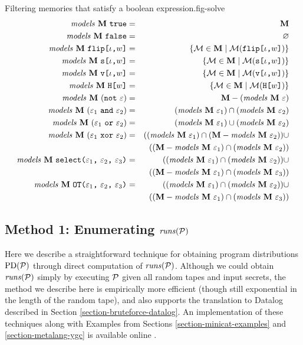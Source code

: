 \begin{fpfig}[t]{Filtering memories that satisfy a boolean expression.}{fig-solve}
\begin{eqnarray*}
\mathit{models}\ \mathbf{M}\ \texttt{true} &=& \mathbf{M}\\
\mathit{models}\ \mathbf{M}\ \texttt{false} &=& \varnothing\\
\mathit{models}\ \mathbf{M}\ \texttt{flip[}\iota\texttt{,}w\texttt{]} &=& \{ \mathcal{M} \in \mathbf{M} \mid \mathcal{M}(\texttt{flip[}\iota\texttt{,}w\texttt{]}) \} \\
\mathit{models}\ \mathbf{M}\ \texttt{s[}\iota\texttt{,}w\texttt{]} &=& \{ \mathcal{M} \in \mathbf{M} \mid \mathcal{M}(\texttt{s[}\iota\texttt{,}w\texttt{]}) \} \\
\mathit{models}\ \mathbf{M}\ \texttt{v[}\iota\texttt{,}w\texttt{]} &=& \{ \mathcal{M} \in \mathbf{M} \mid \mathcal{M}(\texttt{v[}\iota\texttt{,}w\texttt{]}) \} \\
\mathit{models}\ \mathbf{M}\ \texttt{H[}w\texttt{]} &=& \{ \mathcal{M} \in \mathbf{M} \mid \mathcal{M}(\texttt{H[}w\texttt{]}) \} \\
\mathit{models}\ \mathbf{M}\ (\texttt{not}\ \varepsilon) &=& \mathbf{M} - (\mathit{models}\ \mathbf{M}\ \varepsilon)\\
\mathit{models}\ \mathbf{M}\ (\varepsilon_1\ \texttt{and}\ \varepsilon_2) &=& (\mathit{models}\ \mathbf{M}\ \varepsilon_1) \cap (\mathit{models}\ \mathbf{M}\ \varepsilon_2) \\
\mathit{models}\ \mathbf{M}\ (\varepsilon_1\ \texttt{or}\ \varepsilon_2) &=& (\mathit{models}\ \mathbf{M}\ \varepsilon_1) \cup (\mathit{models}\ \mathbf{M}\ \varepsilon_2) \\
\mathit{models}\ \mathbf{M}\ (\varepsilon_1\ \texttt{xor}\ \varepsilon_2) &=&
 ((\mathit{models}\ \mathbf{M}\ \varepsilon_1) \cap (\mathbf{M} - \mathit{models}\ \mathbf{M}\ \varepsilon_2)) \cup\\
 && ((\mathbf{M} - \mathit{models}\ \mathbf{M}\ \varepsilon_1) \cap (\mathit{models}\ \mathbf{M}\ \varepsilon_2)) \\
\mathit{models}\ \mathbf{M}\ \texttt{select(} \varepsilon_1 \texttt{,}\ \varepsilon_2 \texttt{,}\ \varepsilon_3 \texttt{)} &=&
 ((\mathit{models}\ \mathbf{M}\ \varepsilon_1) \cap (\mathit{models}\ \mathbf{M}\ \varepsilon_2)) \cup \\
 && ((\mathbf{M} - \mathit{models}\ \mathbf{M}\ \varepsilon_1) \cap (\mathit{models}\ \mathbf{M}\ \varepsilon_3)) \\
\mathit{models}\ \mathbf{M}\ \texttt{OT(} \varepsilon_1 \texttt{,}\ \varepsilon_2 \texttt{,}\ \varepsilon_3 \texttt{)} &=&
 ((\mathit{models}\ \mathbf{M}\ \varepsilon_1) \cap (\mathit{models}\ \mathbf{M}\ \varepsilon_2)) \cup\\
 && ((\mathbf{M} - \mathit{models}\ \mathbf{M}\ \varepsilon_1) \cap (\mathit{models}\ \mathbf{M}\ \varepsilon_3))
\end{eqnarray*}
\end{fpfig}

\subsection{Method 1: Enumerating $\mathit{runs}(\mathcal{P})$}

Here we describe a straightforward technique for obtaining program
distributions $\mathrm{PD}(\mathcal{P})$ through direct computation of
$\mathit{runs}(\mathcal{P})$. Although we could obtain $\mathit{runs}(\mathcal{P})$ simply by
executing $\mathcal{P}$ given all random tapes and input secrets, the method
we describe here is empirically more efficient (though still
exponential in the length of the random tape), and also supports the
translation to Datalog described in Section
\ref{section-bruteforce-datalog}. An implementation of these
techniques along with Examples from Sections
\ref{section-minicat-examples} and \ref{section-metalang-ygc} is
available online \cite{XXX}.


